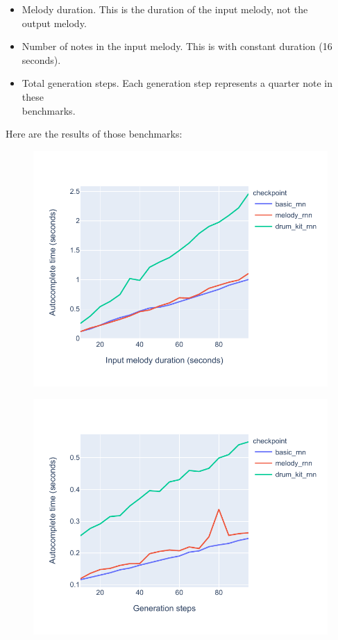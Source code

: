 \begin{itemize}
  \item Melody duration. This is the duration of the input melody, not the \\
        output melody.
  \item Number of notes in the input melody. This is with constant duration (16 seconds).
  \item Total generation steps. Each generation step represents a quarter note in these \\
        benchmarks.
\end{itemize}

Here are the results of those benchmarks:

\begin{figure}
  \includegraphics[width=\linewidth]{image/perfwrtduration.pdf}
  \label{fig:pwrtduration}
\end{figure}
\begin{figure}
  \includegraphics[width=\linewidth]{image/perfwrtsteps.pdf}
  \label{fig:pwrtsteps}
\end{figure}

